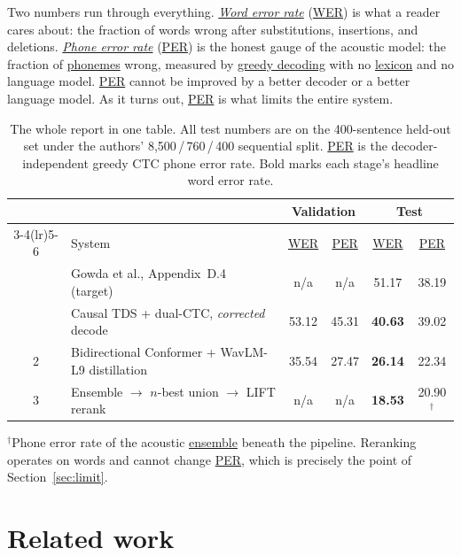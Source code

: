 \documentclass{article}
\DeclareRobustCommand{\glref}[2]{\hyperlink{gl:#1}{\textcolor{glosslink}{#2}}}
\DeclareRobustCommand{\wer}{\glref{wer}{WER}}
\DeclareRobustCommand{\per}{\glref{per}{PER}}
\begin{document}
Two numbers run through everything. \emph{\glref{wer}{Word error rate}} (\wer{}) is what a reader
cares about: the fraction of words wrong after substitutions, insertions, and deletions.
\emph{\glref{per}{Phone error rate}} (\per{}) is the honest gauge of the acoustic model: the fraction
of \glref{phoneme}{phonemes} wrong, measured by \glref{greedy}{greedy decoding} with no
\glref{lexicon}{lexicon} and no language model. \per{} cannot be improved by a better decoder or a
better language model. As it turns out, \per{} is what limits the entire system.

\begin{table}[t]
\centering
\small
\caption{The whole report in one table. All test numbers are on the 400-sentence held-out set under
the authors' 8{,}500\,/\,760\,/\,400 sequential split. \per{} is the decoder-independent greedy CTC
phone error rate. Bold marks each stage's headline word error rate.}
\label{tab:overview}
\setlength{\tabcolsep}{5pt}
\begin{tabular}{@{}c l cc cc@{}}
\toprule
 & & \multicolumn{2}{c}{Validation} & \multicolumn{2}{c}{Test} \\
\cmidrule(lr){3-4}\cmidrule(lr){5-6}
 & System & \wer{} & \per{} & \wer{} & \per{} \\
\midrule
 & Gowda et al., Appendix~D.4 (target)~\citep{gowda2026emg2speech}
   & n/a & n/a & 51.17 & 38.19 \\
\addlinespace[2pt]
1 & Causal TDS + dual-CTC, \emph{corrected} decode
   & 53.12 & 45.31 & \textbf{40.63} & 39.02 \\
2 & Bidirectional Conformer + WavLM-L9 distillation
   & 35.54 & 27.47 & \textbf{26.14} & 22.34 \\
3 & Ensemble $\rightarrow$ $n$-best union $\rightarrow$ LIFT rerank
   & n/a & n/a & \textbf{18.53} & 20.90$^{\dagger}$ \\
\bottomrule
\end{tabular}

\vspace{3pt}
{\footnotesize $^{\dagger}$Phone error rate of the acoustic \glref{ensemble}{ensemble} beneath the
pipeline. Reranking operates on words and cannot change \per{}, which is precisely the point of
Section~\ref{sec:limit}.\par}
\end{table}

\section{Related work}
\label{sec:related}
\end{document}
